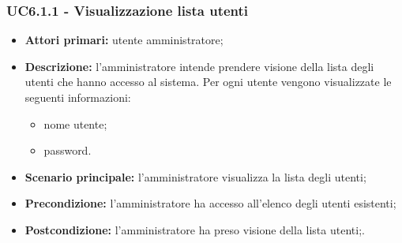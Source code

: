 \subsubsection{UC6.1.1 - Visualizzazione lista utenti}
\begin{itemize}
	\item \textbf{Attori primari:} utente amministratore;
	\item \textbf{Descrizione:} l'amministratore intende prendere visione della lista degli utenti che hanno accesso al sistema. Per ogni utente vengono visualizzate le seguenti informazioni:
		\begin{itemize}
			\item nome utente;
			\item password.
		\end{itemize}
	\item \textbf{Scenario principale:} l'amministratore visualizza la lista degli utenti;
	\item \textbf{Precondizione:} l'amministratore ha accesso all'elenco degli utenti esistenti;
	\item \textbf{Postcondizione:} l'amministratore ha preso visione della lista utenti;.
\end{itemize}

